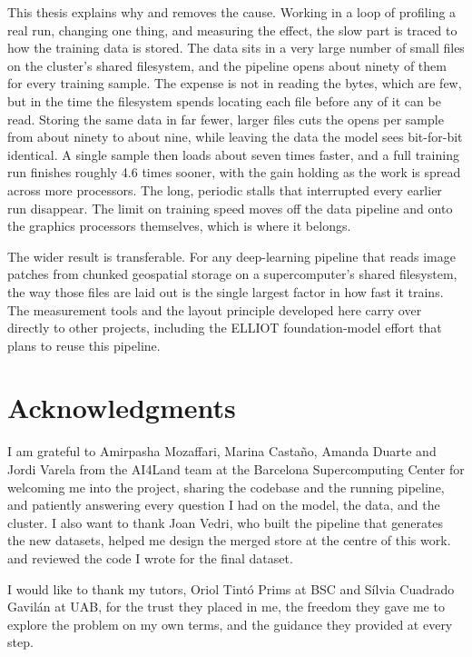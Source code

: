 \documentclass[12pt,a4paper]{article}
\begin{document}
This thesis explains why and removes the cause. Working in a loop of profiling a real run,
changing one thing, and measuring the effect, the slow part is traced to how the training data
is stored. The data sits in a very large number of small files on the cluster's shared
filesystem, and the pipeline opens about ninety of them for every training sample. The expense
is not in reading the bytes, which are few, but in the time the filesystem spends locating each
file before any of it can be read. Storing the same data in far fewer, larger files cuts the
opens per sample from about ninety to about nine, while leaving the data the model sees
bit-for-bit identical. A single sample then loads about seven times faster, and a full training
run finishes roughly 4.6 times sooner, with the gain holding as the work is spread across more
processors. The long, periodic stalls that interrupted every earlier run disappear. The limit
on training speed moves off the data pipeline and onto the graphics processors themselves,
which is where it belongs.

The wider result is transferable. For any deep-learning pipeline that reads image patches from
chunked geospatial storage on a supercomputer's shared filesystem, the way those files are laid
out is the single largest factor in how fast it trains. The measurement tools and the layout
principle developed here carry over directly to other projects, including the ELLIOT
foundation-model effort that plans to reuse this pipeline.

\newpage

\section*{Acknowledgments}

I am grateful to Amirpasha Mozaffari, Marina Casta\~{n}o, Amanda Duarte and Jordi Varela from
the AI4Land team at the Barcelona Supercomputing Center for welcoming me into the project,
sharing the codebase and the running pipeline, and patiently answering every question I had on
the model, the data, and the cluster. I also want to thank Joan Vedri, who built the
pipeline that generates the new datasets, helped me design the merged store at the centre of this
work. and reviewed the code I wrote for the final dataset.

I would like to thank my tutors, Oriol Tint\'o Prims at BSC and S\'ilvia Cuadrado Gavil\'an at
UAB, for the trust they placed in me, the freedom they gave me to explore the problem on my
own terms, and the guidance they provided at every step.
\end{document}
